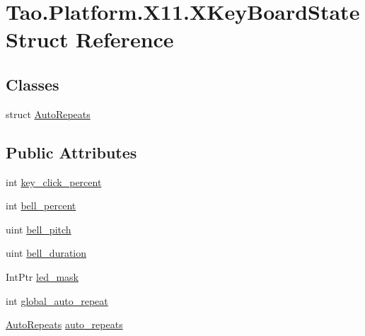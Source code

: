 \hypertarget{struct_tao_1_1_platform_1_1_x11_1_1_x_key_board_state}{
\section{Tao.Platform.X11.XKeyBoardState Struct Reference}
\label{struct_tao_1_1_platform_1_1_x11_1_1_x_key_board_state}
}
\subsection*{Classes}
\begin{DoxyCompactItemize}
\item 
struct \hyperlink{struct_tao_1_1_platform_1_1_x11_1_1_x_key_board_state_1_1_auto_repeats}{AutoRepeats}
\end{DoxyCompactItemize}
\subsection*{Public Attributes}
\begin{DoxyCompactItemize}
\item 
int \hyperlink{struct_tao_1_1_platform_1_1_x11_1_1_x_key_board_state_ad7b9b8f2b253248af41d2fa773593519}{key\_\-click\_\-percent}
\item 
int \hyperlink{struct_tao_1_1_platform_1_1_x11_1_1_x_key_board_state_a7bb1b393466830d0a652e4e10e7e9e4f}{bell\_\-percent}
\item 
uint \hyperlink{struct_tao_1_1_platform_1_1_x11_1_1_x_key_board_state_a98275619744fb722a7d55a1ab786372a}{bell\_\-pitch}
\item 
uint \hyperlink{struct_tao_1_1_platform_1_1_x11_1_1_x_key_board_state_aecc9702c7f34af0c25e5e2df97521659}{bell\_\-duration}
\item 
IntPtr \hyperlink{struct_tao_1_1_platform_1_1_x11_1_1_x_key_board_state_a50a1bb242315a7f2c3da9d99ce3e12b5}{led\_\-mask}
\item 
int \hyperlink{struct_tao_1_1_platform_1_1_x11_1_1_x_key_board_state_aae144a80df9954286672a25a1c8b1b6f}{global\_\-auto\_\-repeat}
\item 
\hyperlink{struct_tao_1_1_platform_1_1_x11_1_1_x_key_board_state_1_1_auto_repeats}{AutoRepeats} \hyperlink{struct_tao_1_1_platform_1_1_x11_1_1_x_key_board_state_abca2a74358b64ca07bf6d0198b41669d}{auto\_\-repeats}
\end{DoxyCompactItemize}


